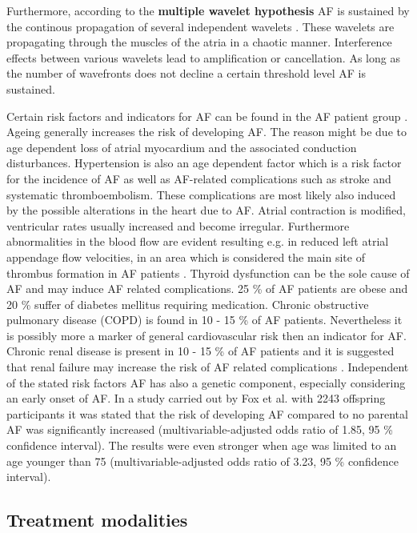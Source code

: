 \documentclass[type=dr, dr=rernat, accentcolor=tud7b,colorbacktitle, bigchapter, openright, twoside, 12pt ]{tudthesis}
\begin{document}
Furthermore, according to the \textbf{multiple wavelet hypothesis} AF is sustained by the continous propagation of  several independent wavelets \cite{CE09}. These wavelets are propagating through the muscles of the atria in a chaotic manner. Interference effects between various wavelets lead to amplification or cancellation. As long as the number of wavefronts does not decline a certain threshold level AF is sustained.\newline

Certain risk factors and indicators for AF can be found in the AF patient group \cite{CE09}. Ageing generally increases the risk of developing AF. The reason might be due to age dependent loss of atrial myocardium and the associated conduction disturbances. Hypertension is also an age dependent factor which is a risk factor for the incidence of AF as well as AF-related complications such as stroke and systematic thromboembolism. These complications are most likely also induced by the possible alterations in the heart due to AF. Atrial contraction is modified, ventricular rates usually increased and become irregular. Furthermore abnormalities in the blood flow are evident resulting e.g. in reduced left atrial appendage flow velocities, in an area which is considered the main site of thrombus formation in AF patients \cite{ESC12}. Thyroid dysfunction can be the sole cause of AF and may induce AF related complications. 25 \% of AF patients are obese \cite{Nab09} and 20 \% suffer of diabetes mellitus requiring 
medication. Chronic obstructive pulmonary disease (COPD) is found in 10 - 15 \% of AF patients. 
Nevertheless it is possibly more a marker of general cardiovascular risk then an indicator for AF. Chronic renal disease is present in 10 - 15 \% of AF patients and it is suggested that renal failure may increase the risk of AF related complications \cite{CE09}. Independent of the stated risk factors AF has also a genetic component, especially considering an early onset of AF. In a study carried out by Fox et al. \cite{Fox04} with 2243 offspring participants it was stated that the risk of developing AF compared to no parental AF was significantly increased (multivariable-adjusted odds ratio of 1.85, 95 \% confidence interval). The results were even stronger when age was limited to an age younger than 75 (multivariable-adjusted odds ratio of 3.23, 95 \% confidence interval). 


\subsection*{Treatment modalities}
\end{document}
